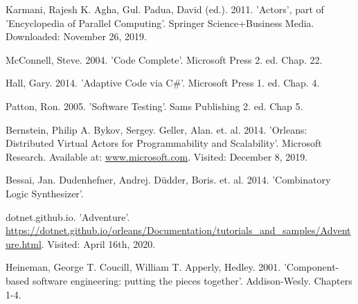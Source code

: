 \begin{thebibliography}{9}
Karmani, Rajesh K. Agha, Gul. Padua, David (ed.). 2011. 'Actors', part of 'Encyclopedia of Parallel Computing'. Springer Science+Business Media. Downloaded: November 26, 2019.

McConnell, Steve. 2004. 'Code Complete'. Microsoft Press 2. ed. Chap. 22.

Hall, Gary. 2014. 'Adaptive Code via C\#'. Microsoft Press 1. ed. Chap. 4.

Patton, Ron. 2005. 'Software Testing'. Sams Publishing 2. ed. Chap 5.

Bernstein, Philip A. Bykov, Sergey. Geller, Alan. et. al. 2014. 'Orleans: Distributed Virtual Actors for Programmability and Scalability'. Microsoft Research. Available at: \url{www.microsoft.com}. Visited: December 8, 2019.

Bessai, Jan. Dudenhefner, Andrej. Düdder, Boris. et. al. 2014. 'Combinatory Logic Synthesizer'.

dotnet.github.io. 'Adventure'. \url{https://dotnet.github.io/orleans/Documentation/tutorials_and_samples/Adventure.html}. Visited: April 16th, 2020.

Heineman, George T. Coucill, William T. Apperly, Hedley. 2001. 'Component-based software engineering: putting the pieces together'. Addison-Wesly. Chapters 1-4.
\end{thebibliography}